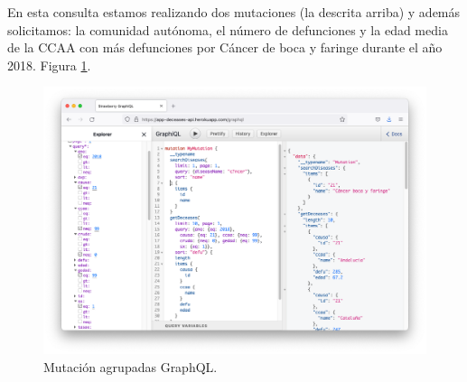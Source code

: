 En esta consulta estamos realizando dos mutaciones (la descrita arriba) y además solicitamos: la comunidad autónoma,
el número de defunciones y la edad media de la CCAA con más defunciones por Cáncer de boca
y faringe durante el año 2018. Figura \ref{fig:6}.
\FloatBarrier
\begin{figure}[h]
	\centering
	\includegraphics[width=\textwidth]{doc/logos/imgs/ejemplo5.png}
	\caption{ Mutación agrupadas GraphQL. }
		\label{fig:6}
\end{figure}
\FloatBarrier
